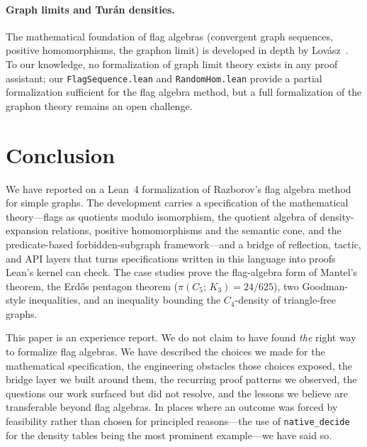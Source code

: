 \documentclass{article}
\newcommand{\tdensity}[2]{\pi(#1;\,#2)}
\newcommand{\lean}[1]{\texttt{#1}}
\begin{document}
\paragraph{Graph limits and Turán densities.}
The mathematical foundation of flag algebras (convergent graph sequences,
positive homomorphisms, the graphon limit) is developed in depth by
Lov\'asz~\cite{lovasz2012large}.  To our knowledge, no formalization of
graph limit theory exists in any proof assistant; our \lean{FlagSequence.lean}
and \lean{RandomHom.lean} provide a partial formalization sufficient for
the flag algebra method, but a full formalization of the graphon theory
remains an open challenge.


\section{Conclusion}
\label{sec:conclusion}

We have reported on a Lean~4 formalization of Razborov's flag algebra method
for simple graphs.  The development carries a specification of the
mathematical theory---flags as quotients modulo isomorphism, the quotient
algebra of density-expansion relations, positive homomorphisms and the
semantic cone, and the predicate-based forbidden-subgraph framework---and a
bridge of reflection, tactic, and API layers that turns specifications
written in this language into proofs Lean's kernel can check.  The case
studies prove the flag-algebra form of Mantel's theorem, the Erd\H{o}s
pentagon theorem ($\tdensity{C_5}{K_3} = 24/625$), two Goodman-style
inequalities, and an inequality bounding the $C_4$-density of triangle-free
graphs.

This paper is an experience report.  We do not claim to have found
\emph{the} right way to formalize flag algebras.  We have described the
choices we made for the mathematical specification, the engineering
obstacles those choices exposed, the bridge layer we built around them, the
recurring proof patterns we observed, the questions our work surfaced but
did not resolve, and the lessons we believe are transferable beyond flag
algebras.  In places where an outcome was forced by feasibility rather than
chosen for principled reasons---the use of \lean{native\_decide} for the
density tables being the most prominent example---we have said so.
\end{document}
